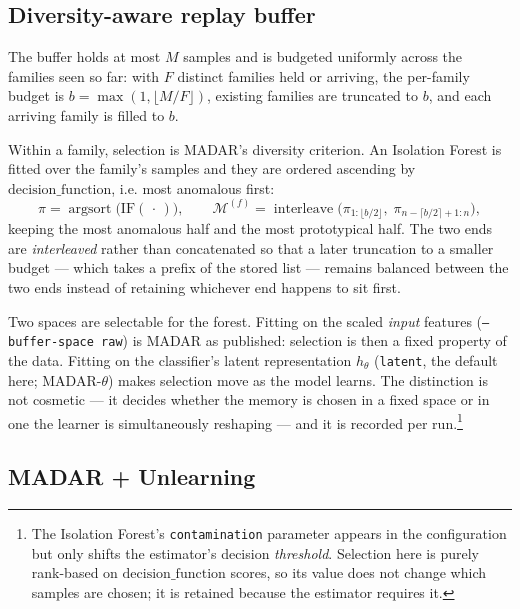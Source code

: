 \subsection{Diversity-aware replay buffer}
\label{sec:method:buffer}

The buffer holds at most $M$ samples and is budgeted uniformly across the
families seen so far: with $F$ distinct families held or arriving, the
per-family budget is $b = \max(1, \lfloor M / F \rfloor)$, existing families are
truncated to $b$, and each arriving family is filled to $b$.

Within a family, selection is MADAR's diversity criterion. An Isolation Forest
is fitted over the family's samples and they are ordered ascending by
$\mathrm{decision\_function}$, i.e. most anomalous first:
\begin{equation}
  \label{eq:buffer-order}
  \pi = \operatorname{argsort}\big(\mathrm{IF}(\,\cdot\,)\big),
  \qquad
  \mathcal{M}^{(f)} = \operatorname{interleave}\big(
     \pi_{1:\lfloor b/2 \rfloor},\;
     \pi_{n - \lceil b/2 \rceil + 1 : n}\big),
\end{equation}
keeping the most anomalous half and the most prototypical half. The two ends are
\emph{interleaved} rather than concatenated so that a later truncation to a
smaller budget --- which takes a prefix of the stored list --- remains balanced
between the two ends instead of retaining whichever end happens to sit first.

Two spaces are selectable for the forest. Fitting on the scaled \emph{input}
features (\texttt{--buffer-space raw}) is MADAR as published: selection is then a
fixed property of the data. Fitting on the classifier's latent representation
$h_\theta$ (\texttt{latent}, the default here; MADAR-$\theta$) makes selection
move as the model learns. The distinction is not cosmetic --- it decides whether
the memory is chosen in a fixed space or in one the learner is simultaneously
reshaping --- and it is recorded per run.\footnote{The Isolation Forest's
\texttt{contamination} parameter appears in the configuration but only shifts the
estimator's decision \emph{threshold}. Selection here is purely rank-based on
$\mathrm{decision\_function}$ scores, so its value does not change which samples
are chosen; it is retained because the estimator requires it.}

\subsection{MADAR + Unlearning}
\label{sec:method:unlearn}

